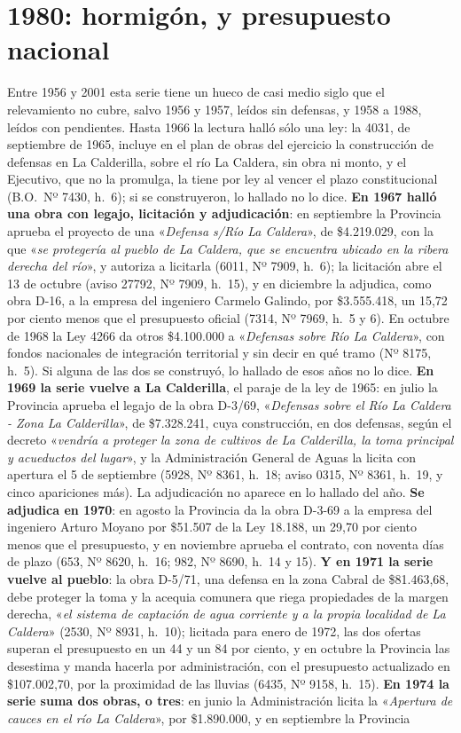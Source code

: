 \section{1980: hormigón, y presupuesto nacional}

Entre 1956 y 2001 esta serie tiene un hueco de casi medio siglo que el relevamiento no cubre, salvo 1956 y 1957, leídos sin defensas, y 1958 a 1988, leídos con pendientes. Hasta 1966 la lectura halló sólo una ley: la 4031, de septiembre de 1965, incluye en el plan de obras del ejercicio la construcción de defensas en La Calderilla, sobre el río La Caldera, sin obra ni monto, y el Ejecutivo, que no la promulga, la tiene por ley al vencer el plazo constitucional (B.O.\ Nº 7430, h.\ 6); si se construyeron, lo hallado no lo dice. \textbf{En 1967 halló una obra con legajo, licitación y adjudicación}: en septiembre la Provincia aprueba el proyecto de una «\textit{Defensa s/Río La Caldera}», de \$4.219.029, con la que «\textit{se protegería al pueblo de La Caldera, que se encuentra ubicado en la ribera derecha del río}», y autoriza a licitarla (6011, Nº 7909, h.\ 6); la licitación abre el 13 de octubre (aviso 27792, Nº 7909, h.\ 15), y en diciembre la adjudica, como obra D-16, a la empresa del ingeniero Carmelo Galindo, por \$3.555.418, un 15,72 por ciento menos que el presupuesto oficial (7314, Nº 7969, h.\ 5 y 6). En octubre de 1968 la Ley 4266 da otros \$4.100.000 a «\textit{Defensas sobre Río La Caldera}», con fondos nacionales de integración territorial y sin decir en qué tramo (Nº 8175, h.\ 5). Si alguna de las dos se construyó, lo hallado de esos años no lo dice. \textbf{En 1969 la serie vuelve a La Calderilla}, el paraje de la ley de 1965: en julio la Provincia aprueba el legajo de la obra D-3/69, «\textit{Defensas sobre el Río La Caldera - Zona La Calderilla}», de \$7.328.241, cuya construcción, en dos defensas, según el decreto «\textit{vendría a proteger la zona de cultivos de La Calderilla, la toma principal y acueductos del lugar}», y la Administración General de Aguas la licita con apertura el 5 de septiembre (5928, Nº 8361, h.\ 18; aviso 0315, Nº 8361, h.\ 19, y cinco apariciones más). La adjudicación no aparece en lo hallado del año. \textbf{Se adjudica en 1970}: en agosto la Provincia da la obra D-3-69 a la empresa del ingeniero Arturo Moyano por \$51.507 de la Ley 18.188, un 29,70 por ciento menos que el presupuesto, y en noviembre aprueba el contrato, con noventa días de plazo (653, Nº 8620, h.\ 16; 982, Nº 8690, h.\ 14 y 15). \textbf{Y en 1971 la serie vuelve al pueblo}: la obra D-5/71, una defensa en la zona Cabral de \$81.463,68, debe proteger la toma y la acequia comunera que riega propiedades de la margen derecha, «\textit{el sistema de captación de agua corriente y a la propia localidad de La Caldera}» (2530, Nº 8931, h.\ 10); licitada para enero de 1972, las dos ofertas superan el presupuesto en un 44 y un 84 por ciento, y en octubre la Provincia las desestima y manda hacerla por administración, con el presupuesto actualizado en \$107.002,70, por la proximidad de las lluvias (6435, Nº 9158, h.\ 15). \textbf{En 1974 la serie suma dos obras, o tres}: en junio la Administración licita la «\textit{Apertura de cauces en el río La Caldera}», por \$1.890.000, y en septiembre la Provincia 